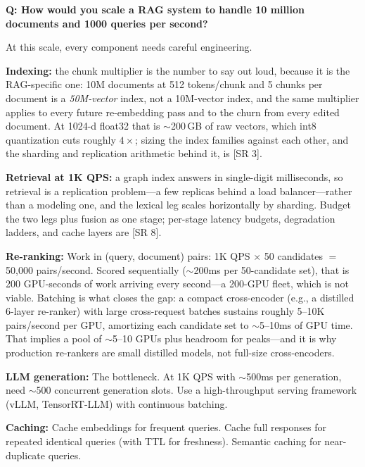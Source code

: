 \bigskip

\begin{interviewq}
\textbf{Q: How would you scale a RAG system to handle 10 million documents and
1000 queries per second?}

 \quad {} \quad \badgefreq{\freqmed}

\stronganswer
At this scale, every component needs careful engineering.

\textbf{Indexing:} the chunk multiplier is the number to say out loud, because
it is the RAG-specific one: 10M documents at 512 tokens/chunk and 5 chunks per
document is a \emph{50M-vector} index, not a 10M-vector index, and the same
multiplier applies to every future re-embedding pass and to the churn from
every edited document.  At 1024-d float32 that is $\sim$200\,GB of raw vectors,
which int8 quantization cuts roughly $4\times$; sizing the index families
against each other, and the sharding and replication arithmetic behind it, is
[SR 3].

\textbf{Retrieval at 1K QPS:} a graph index answers in single-digit
milliseconds, so retrieval is a replication problem---a few replicas behind a
load balancer---rather than a modeling one, and the lexical leg scales
horizontally by sharding.  Budget the two legs plus fusion as one stage;
per-stage latency budgets, degradation ladders, and cache layers are [SR 8].

\textbf{Re-ranking:} Work in (query, document) pairs: 1K QPS $\times$ 50
candidates $=$ 50,000 pairs/second.  Scored sequentially ($\sim$200ms per
50-candidate set), that is 200 GPU-seconds of work arriving every second---a
200-GPU fleet, which is not viable.  Batching is what closes the gap: a
compact cross-encoder (e.g., a distilled 6-layer re-ranker) with large
cross-request batches sustains roughly 5--10K pairs/second per GPU,
amortizing each candidate set to $\sim$5--10ms of GPU time.  That implies a
pool of $\sim$5--10 GPUs plus headroom for peaks---and it is why production
re-rankers are small distilled models, not full-size cross-encoders.

\textbf{LLM generation:} The bottleneck.  At 1K QPS with $\sim$500ms per
generation, need $\sim$500 concurrent generation slots.  Use a high-throughput
serving framework (vLLM, TensorRT-LLM) with continuous batching.

\textbf{Caching:} Cache embeddings for frequent queries.  Cache full responses
for repeated identical queries (with TTL for freshness).  Semantic caching for
near-duplicate queries.


\end{interviewq}
